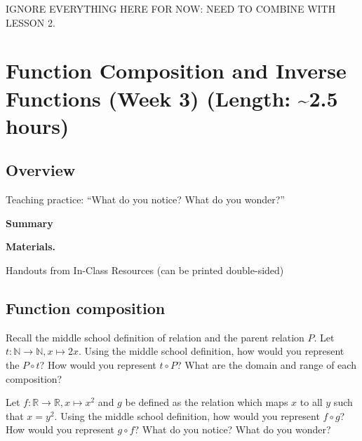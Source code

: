 \documentclass[11pt]{article}
\newcommand\header[1]{\vspace*{4pt}\par {\large {\bf #1}}\par}
\newcommand\about{\textasciitilde}
\newenvironment{bignote}[1][Instructor note]%
	{\begin{mdframed}\raggedright{\bf #1.~}}
	{\end{mdframed}}
\newenvironment{task}
	{\begin{mdframed}[linecolor=lightgray, linewidth=3pt]\raggedright}
	{\end{mdframed}}
\newcommand{\R}{\mathbb{R}}
\newcommand{\N}{\mathbb{N}}
\theoremstyle{definition}
\begin{document}
\newpage 

IGNORE EVERYTHING HERE FOR NOW: NEED TO COMBINE WITH LESSON 2.

\section{Function Composition and Inverse Functions (Week 3) (Length: \about 2.5 hours)}  
\subsection{Overview}

Teaching practice: ``What do you notice? What do you wonder?''

\header{Summary}
\newpage
\begin{bignote}[Materials]
\begin{itemize*}
\item Handouts from In-Class Resources (can be printed double-sided)
\end{itemize*}
\end{bignote}
\subsection{Function composition}

\begin{task}
Recall the middle school definition of relation and the parent relation $P$. Let $t:\N\to \N, x\mapsto 2x$. Using the middle school definition, how would you represent the $P\circ t$? How would you represent $t\circ P$? What are the domain and range of each composition?

Let $f:\R\to\R, x \mapsto x^2$ and $g$ be defined as the relation which maps $x$ to all $y$ such that $x=y^2$.  Using the middle school definition, how would you represent $f\circ g$? How would you represent $g\circ f$? What do you notice? What do you wonder?
\end{task}
\end{document}
